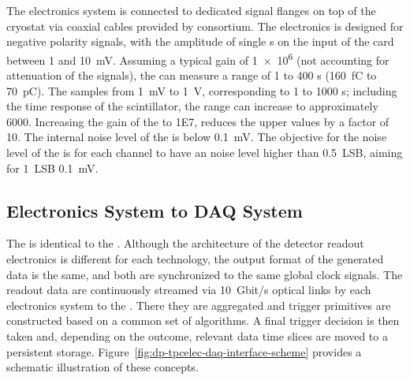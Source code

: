 The  electronics system is connected to dedicated 
 signal \fdth flanges on top of the cryostat via coaxial cables provided by %
 consortium. 
The  electronics is designed for negative polarity  signals, with the amplitude of single \phel{}s on the input of the card between \num{1} and \SI{10}{\milli\volt}. Assuming a typical  gain of \num{1e6} (not accounting for attenuation of the signals), the   can measure a range of \num{1} to \num{400} \phel{}s (\SI{160}{\femto\coulomb} to \SI{70}{\pico\coulomb}). The  samples from \SI{1}{\milli\volt} to \SI{1}{\volt}, corresponding to \num{1} to \num{1000} \phel{}s; including the time response of the scintillator, the range can increase to approximately \num{6000}. Increasing the gain of the  to \num{1E7}, reduces the upper values by a factor of 10. The internal noise level of the  is below \SI{0.1}{\milli\volt}. The objective for the noise level of the  is for each channel to have an  noise level higher than \SI{0.5}{LSB}, aiming for \SI{1}{LSB} \SI{0.1}{\milli\volt}.


\subsection{Electronics System to DAQ System}
\label{ssec:dp-tpcelec-intfc-daq}

The   is identical to the  . Although the architecture of the detector readout electronics is different for each technology, %
the output format of the generated data is the same, and both are synchronized to the same global clock signals. The readout data are continuously streamed via \SI{10}{Gbit/s} optical links 
by each   electronics system to the .  There they are aggregated and trigger primitives are constructed based on a common set of algorithms. A final trigger decision is then taken and, depending on the outcome, relevant data time slices are moved to a persistent storage. Figure~\ref{fig:dp-tpcelec-daq-interface-scheme} provides a schematic illustration of these concepts.
  
